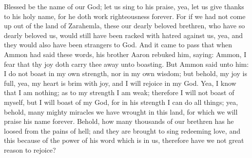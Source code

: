 \bverse \iffalse Blessed be the name of our God; let us sing to his praise, yea, let us give thanks to his holy name, for he doth work righteousness forever. \fi
Blessed be the name of our God; let us sing to his praise, yea, let us give thanks to his holy name, for he doth work righteousness forever.
\bverse \iffalse For if we had not come up out of the land of Zarahemla, these our dearly beloved brethren, who have so dearly beloved us, would still have been racked with hatred against us, yea, and they would also have been strangers to God. \fi
For if we had not come up out of the land of Zarahemla, these our dearly beloved brethren, who have so dearly beloved us, would still have been racked with hatred against us, yea, and they would also have been strangers to God.
\bverse \iffalse And it came to pass that when Ammon had said these words, his brother Aaron rebuked him, saying: Ammon, I fear that thy joy doth carry thee away unto boasting. \fi
And it came to pass that when Ammon had said these words, his brother Aaron rebuked him, saying: Ammon, I fear that thy joy doth carry thee away unto boasting.
\bverse \iffalse But Ammon said unto him: I do not boast in my own strength, nor in my own wisdom; but behold, my joy is full, yea, my heart is brim with joy, and I will rejoice in my God. \fi
But Ammon said unto him: I do not boast in my own strength, nor in my own wisdom; but behold, my joy is full, yea, my heart is brim with joy, and I will rejoice in my God.
\bverse \iffalse Yea, I know that I am nothing; as to my strength I am weak; therefore I will not boast of myself, but I will boast of my God, for in his strength I can do all things; yea, behold, many mighty miracles we have wrought in this land, for which we will praise his name forever. \fi
Yea, I know that I am nothing; as to my strength I am weak; therefore I will not boast of myself, but I will boast of my God, for in his strength I can do all things; yea, behold, many mighty miracles we have wrought in this land, for which we will praise his name forever.
\bverse \iffalse Behold, how many thousands of our brethren has he loosed from the pains of hell; and they are brought to sing redeeming love, and this because of the power of his word which is in us, therefore have we not great reason to rejoice? \fi
Behold, how many thousands of our brethren has he loosed from the pains of hell; and they are brought to sing redeeming love, and this because of the power of his word which is in us, therefore have we not great reason to rejoice?
